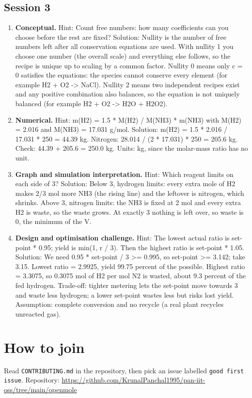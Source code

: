 \documentclass[11pt,a4paper]{article}
\begin{document}
\subsection*{Session 3}
\begin{enumerate}[nosep]
\item \textbf{Conceptual.} Hint: Count free numbers: how many coefficients can you choose before the rest are fixed? Solution: Nullity is the number of free numbers left after all conservation equations are used. With nullity 1 you choose one number (the overall scale) and everything else follows, so the recipe is unique up to scaling by a common factor. Nullity 0 means only c = 0 satisfies the equations: the species cannot conserve every element (for example H2 + O2 -\textgreater{} NaCl). Nullity 2 means two independent recipes exist and any positive combination also balances, so the equation is not uniquely balanced (for example H2 + O2 -\textgreater{} H2O + H2O2).
\item \textbf{Numerical.} Hint: m(H2) = 1.5 * M(H2) / M(NH3) * m(NH3) with M(H2) = 2.016 and M(NH3) = 17.031 g/mol. Solution: m(H2) = 1.5 * 2.016 / 17.031 * 250 = 44.39 kg. Nitrogen: 28.014 / (2 * 17.031) * 250 = 205.6 kg. Check: 44.39 + 205.6 = 250.0 kg. Units: kg, since the molar-mass ratio has no unit.
\item \textbf{Graph and simulation interpretation.} Hint: Which reagent limits on each side of 3? Solution: Below 3, hydrogen limits: every extra mole of H2 makes 2/3 mol more NH3 (the rising line) and the leftover is nitrogen, which shrinks. Above 3, nitrogen limits: the NH3 is fixed at 2 mol and every extra H2 is waste, so the waste grows. At exactly 3 nothing is left over, so waste is 0, the minimum of the V.
\item \textbf{Design and optimisation challenge.} Hint: The lowest actual ratio is set-point * 0.95; yield is min(1, r / 3). Then the highest ratio is set-point * 1.05. Solution: We need 0.95 * set-point / 3 \textgreater{}= 0.995, so set-point \textgreater{}= 3.142; take 3.15. Lowest ratio = 2.9925, yield 99.75 percent of the possible. Highest ratio = 3.3075, so 0.3075 mol of H2 per mol N2 is wasted, about 9.3 percent of the fed hydrogen. Trade-off: tighter metering lets the set-point move towards 3 and waste less hydrogen; a lower set-point wastes less but risks lost yield. Assumption: complete conversion and no recycle (a real plant recycles unreacted gas).
\end{enumerate}

\section{How to join}
Read \texttt{CONTRIBUTING.md} in the repository, then pick an issue labelled \texttt{good first issue}. Repository: \url{https://github.com/KrunalPanchal1995/pan-iit-oss/tree/main/openmole}
\end{document}
